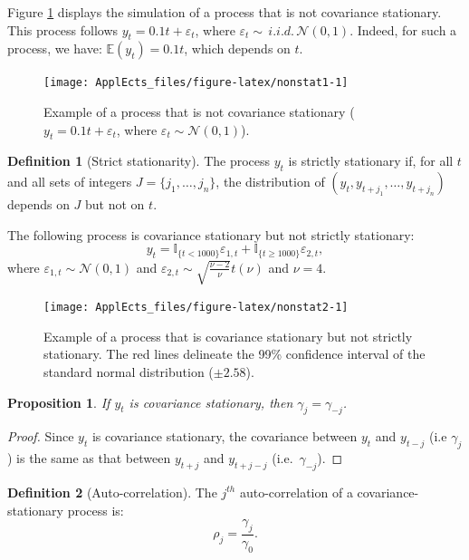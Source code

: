 \documentclass[
  12pt,
]{book}
\newtheorem{proposition}{Proposition}[chapter]
\theoremstyle{definition}
\newtheorem{definition}{Definition}[chapter]
\theoremstyle{definition}
\theoremstyle{definition}
\theoremstyle{definition}
\theoremstyle{remark}
\begin{document}
Figure \ref{fig:nonstat1} displays the simulation of a process that is not covariance stationary. This process follows \(y_t = 0.1t + \varepsilon_t\), where \(\varepsilon_t \sim\,i.i.d.\,\mathcal{N}(0,1)\). Indeed, for such a process, we have: \(\mathbb{E}(y_t)=0.1t\), which depends on \(t\).

\begin{figure}
\texttt{[image: ApplEcts\_files/figure-latex/nonstat1-1]} \caption{Example of a process that is not covariance stationary ($y_t = 0.1t + \varepsilon_t$, where $\varepsilon_t \sim \mathcal{N}(0,1)$).}\label{fig:nonstat1}
\end{figure}

\begin{definition}[Strict stationarity]
\protect\hypertarget{def:strictstat}{}\label{def:strictstat}The process \(y_t\) is strictly stationary if, for all \(t\) and all sets of integers \(J=\{j_1,\dots,j_n\}\), the distribution of \((y_{t},y_{t+j_1},\dots,y_{t+j_n})\) depends on \(J\) but not on \(t\).
\end{definition}

The following process is covariance stationary but not strictly stationary:
\[
y_t = \mathbb{I}_{\{t<1000\}}\varepsilon_{1,t}+\mathbb{I}_{\{t\ge1000\}}\varepsilon_{2,t},
\]
where \(\varepsilon_{1,t} \sim \mathcal{N}(0,1)\) and \(\varepsilon_{2,t} \sim \sqrt{\frac{\nu - 2}{\nu}} t(\nu)\) and \(\nu = 4\).

\begin{figure}
\texttt{[image: ApplEcts\_files/figure-latex/nonstat2-1]} \caption{Example of a process that is covariance stationary but not strictly stationary. The red lines delineate the 99\% confidence interval of the standard normal distribution ($\pm 2.58$).}\label{fig:nonstat2}
\end{figure}

\begin{proposition}
\protect\hypertarget{prp:gammaMinus}{}\label{prp:gammaMinus}If \(y_t\) is covariance stationary, then \(\gamma_j = \gamma_{-j}\).
\end{proposition}

\begin{proof}
Since \(y_t\) is covariance stationary, the covariance between \(y_t\) and \(y_{t-j}\) (i.e \(\gamma_j\)) is the same as that between \(y_{t+j}\) and \(y_{t+j-j}\) (i.e.~\(\gamma_{-j}\)).
\end{proof}

\begin{definition}[Auto-correlation]
\protect\hypertarget{def:autocor}{}\label{def:autocor}The \(j^{th}\) auto-correlation of a covariance-stationary process is:
\[
\rho_j = \frac{\gamma_j}{\gamma_0}.
\]
\end{definition}
\end{document}
